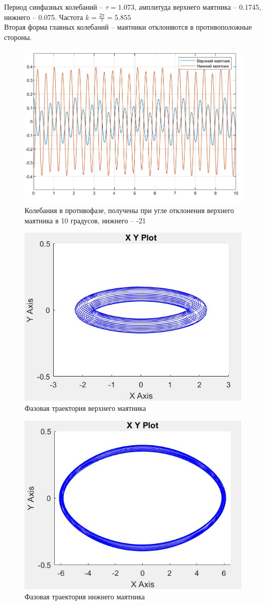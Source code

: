 \documentclass{article}
\begin{document}
	Период синфазных колебаний -- $\tau = 1.073$, амплитуда верхнего маятника -- 0.1745, нижнего -- 0.075. Частота $k = \frac{2\pi}{\tau} = 5.855$\\
	Вторая форма главных колебаний -- маятники отклоняются в противоположные стороны. 
	\begin{figure}[H]
		\centering
		\includegraphics[width=0.7\linewidth]{gegenphase_10_-21}
		\caption{Колебания в противофазе, получены при угле отклонения верхнего маятника в 10 градусов, нижнего -- -21}
		\label{fig:gegenphase10-21}
	\end{figure}
	\begin{figure}[H]
		\centering
		\includegraphics[width=0.7\linewidth]{gegenphase_upper}
		\caption{Фазовая траектория верхнего маятника}
		\label{fig:gegenphaseupper}
	\end{figure}
	\begin{figure}[H]
		\centering
		\includegraphics[width=0.7\linewidth]{gegenphase_lower}
		\caption{Фазовая траектория нижнего маятника}
		\label{fig:gegenphaselower}
	\end{figure}
\end{document}
